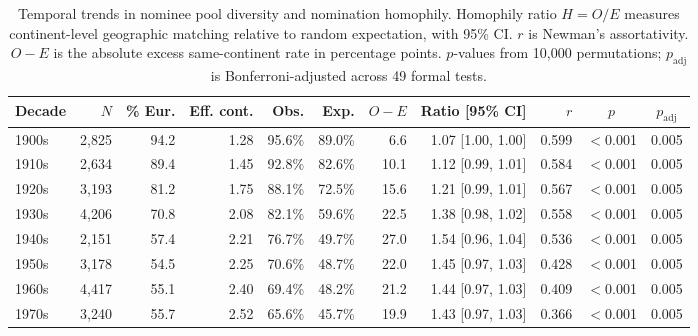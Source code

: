 \begin{table}[ht]
\centering
\caption{Temporal trends in nominee pool diversity and nomination homophily. Homophily ratio $H = O/E$ measures continent-level geographic matching relative to random expectation, with 95\% CI. $r$ is Newman's assortativity. $O - E$ is the absolute excess same-continent rate in percentage points. $p$-values from 10{,}000 permutations; $p_{\text{adj}}$ is Bonferroni-adjusted across 49 formal tests.}
\label{tab:temporal_homophily}
\small
\begin{tabular}{lrrrrrrrrcc}
\toprule
Decade & $N$ & \% Eur. & Eff. cont. & Obs. & Exp. & $O - E$ & Ratio [95\% CI] & $r$ & $p$ & $p_{\text{adj}}$ \\
\midrule
1900s & 2,825 & 94.2 & 1.28 & 95.6\% & 89.0\% & 6.6 & 1.07 [1.00, 1.00] & 0.599 & $<$0.001 & 0.005 \\
1910s & 2,634 & 89.4 & 1.45 & 92.8\% & 82.6\% & 10.1 & 1.12 [0.99, 1.01] & 0.584 & $<$0.001 & 0.005 \\
1920s & 3,193 & 81.2 & 1.75 & 88.1\% & 72.5\% & 15.6 & 1.21 [0.99, 1.01] & 0.567 & $<$0.001 & 0.005 \\
1930s & 4,206 & 70.8 & 2.08 & 82.1\% & 59.6\% & 22.5 & 1.38 [0.98, 1.02] & 0.558 & $<$0.001 & 0.005 \\
1940s & 2,151 & 57.4 & 2.21 & 76.7\% & 49.7\% & 27.0 & 1.54 [0.96, 1.04] & 0.536 & $<$0.001 & 0.005 \\
1950s & 3,178 & 54.5 & 2.25 & 70.6\% & 48.7\% & 22.0 & 1.45 [0.97, 1.03] & 0.428 & $<$0.001 & 0.005 \\
1960s & 4,417 & 55.1 & 2.40 & 69.4\% & 48.2\% & 21.2 & 1.44 [0.97, 1.03] & 0.409 & $<$0.001 & 0.005 \\
1970s & 3,240 & 55.7 & 2.52 & 65.6\% & 45.7\% & 19.9 & 1.43 [0.97, 1.03] & 0.366 & $<$0.001 & 0.005 \\
\bottomrule
\end{tabular}
\end{table}
